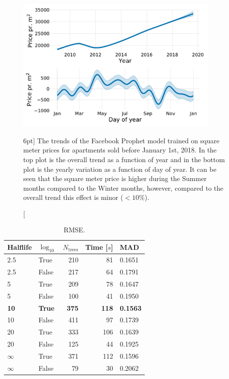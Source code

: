 \documentclass[a4paper, twoside, nobib]{tufte-book}
\begin{document}
\begin{figure}
  \includegraphics[width=0.9\textwidth]{figures/housing/Ejerlejlighed_v17_cut_all_Ncols_all_prophet_trends.pdf}
  \caption[Prophet Trends][6pt]
          {The trends of the Facebook Prophet model trained on square meter prices for apartments sold before January 1st, 2018. In the top plot is the overall trend as a function of year and in the bottom plot is the yearly variation as a function of day of year. It can be seen that the square meter price is higher during the Summer months compared to the Winter months, however, compared to the overall trend this effect is minor ($<10\%$). 
          }
  \label{fig:h:prophet_trends}
\end{figure}




\begin{table}[]
  \begin{tabular}{@{}llrrl@{}}
    \toprule
  Halflife & $\log_{10}$ & $N_\mathrm{trees}$ & Time [$s$]   & MAD    \\ \midrule
  2.5 & True & 210 & 81  & 0.1651 \\
  2.5 & False & 217 & 64  & 0.1791 \\
  5   & True & 209 & 78  & 0.1647 \\
  5   & False & 100 & 41  & 0.1950  \\
  \textbf{10}  & \textbf{True} & \textbf{375} & \textbf{118} & \textbf{0.1563} \\
  10  & False & 411 & 97   & 0.1739 \\
  20  & True & 333 & 106 & 0.1639 \\
  20  & False & 125 & 44  & 0.1925 \\
  $\infty$   & True & 371 & 112 & 0.1596 \\
  $\infty$   & False & 79  & 30  & 0.2062 \\ \bottomrule
  \end{tabular}
  \caption{\label{tab:h:HPO_initial_RMSE}RMSE.}
  \end{table}
  
\end{document}
